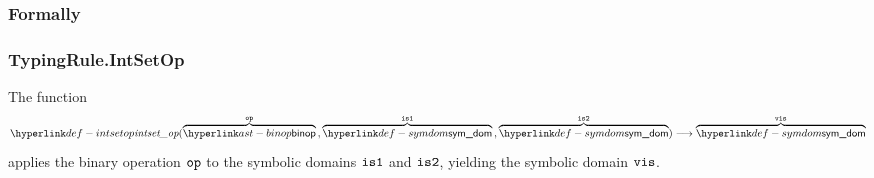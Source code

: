 \subsubsection{Formally}
\begin{mathpar}
\end{mathpar}

\begin{mathpar}
\end{mathpar}

\begin{mathpar}
\end{mathpar}

\subsubsection{TypingRule.IntSetOp \label{sec:TypingRule.IntSetOp}}
\hypertarget{def-intsetop}{}
The function
\[
\intsetop(\overname{\binop}{\op} \aslsep \overname{\symdom}{\visone} \aslsep \overname{\symdom}{\vistwo})
\aslto \overname{\symdom}{\vis}
\]
applies the binary operation $\op$ to the symbolic domains $\visone$ and $\vistwo$,
yielding the symbolic domain $\vis$.

